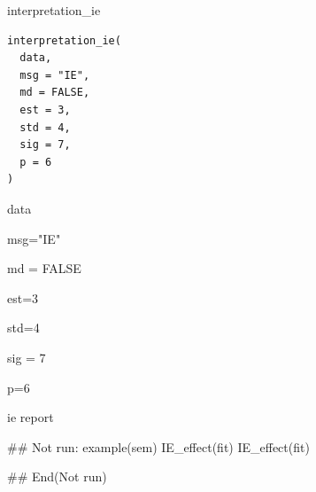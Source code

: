 \documentclass[a4paper]{book}
\begin{document}
%
\begin{Description}
interpretation\_ie
\end{Description}
%
\begin{Usage}
\begin{verbatim}
interpretation_ie(
  data,
  msg = "IE",
  md = FALSE,
  est = 3,
  std = 4,
  sig = 7,
  p = 6
)
\end{verbatim}
\end{Usage}
%
\begin{Arguments}
\begin{ldescription}
\item[\code{data}] data

\item[\code{msg}] msg="IE"

\item[\code{md}] md = FALSE

\item[\code{est}] est=3

\item[\code{std}] std=4

\item[\code{sig}] sig = 7

\item[\code{p}] p=6
\end{ldescription}
\end{Arguments}
%
\begin{Value}
ie report
\end{Value}
%
\begin{Examples}
\begin{ExampleCode}

\#\# Not run: 
example(sem)
IE_effect(fit)
IE_effect(fit) %

## End(Not run)
\end{ExampleCode}
\end{Examples}
\end{document}
